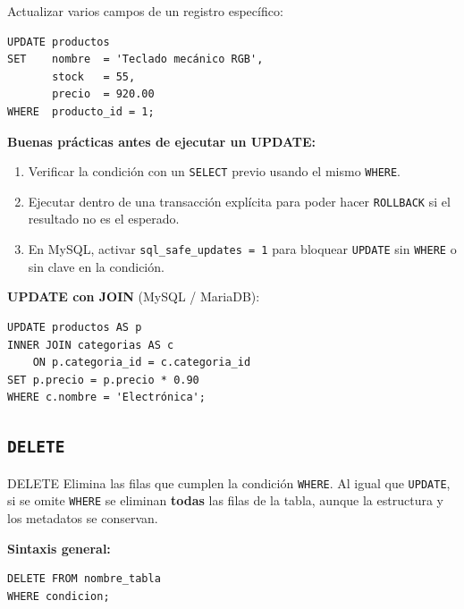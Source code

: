 \begin{ejemplo}
  Actualizar varios campos de un registro específico:

\begin{lstlisting}[style=sql, caption={UPDATE de múltiples columnas por clave primaria}]
UPDATE productos
SET    nombre  = 'Teclado mecánico RGB',
       stock   = 55,
       precio  = 920.00
WHERE  producto_id = 1;
\end{lstlisting}
\end{ejemplo}

\begin{nota}
  \textbf{Buenas prácticas antes de ejecutar un UPDATE:}
  \begin{enumerate}
    \item Verificar la condición con un \texttt{SELECT} previo usando el mismo
          \texttt{WHERE}.
    \item Ejecutar dentro de una transacción explícita para poder hacer
          \texttt{ROLLBACK} si el resultado no es el esperado.
    \item En MySQL, activar \texttt{sql\_safe\_updates = 1} para bloquear
          \texttt{UPDATE} sin \texttt{WHERE} o sin clave en la condición.
  \end{enumerate}
\end{nota}

\textbf{UPDATE con JOIN} (MySQL / MariaDB):

\begin{lstlisting}[style=sql, caption={UPDATE que referencia otra tabla mediante JOIN}]
UPDATE productos AS p
INNER JOIN categorias AS c
    ON p.categoria_id = c.categoria_id
SET p.precio = p.precio * 0.90
WHERE c.nombre = 'Electrónica';
\end{lstlisting}

\subsection{\texttt{DELETE}}

\begin{definicion}{DELETE}
  Elimina las filas que cumplen la condición \texttt{WHERE}. Al igual que
  \texttt{UPDATE}, si se omite \texttt{WHERE} se eliminan \textbf{todas} las
  filas de la tabla, aunque la estructura y los metadatos se conservan.
\end{definicion}

\textbf{Sintaxis general:}

\begin{lstlisting}[style=sql, caption={Sintaxis de DELETE con WHERE}]
DELETE FROM nombre_tabla
WHERE condicion;
\end{lstlisting}

